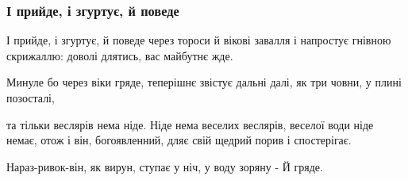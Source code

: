  
 
 

\subsubsection{І прийде, і згуртує, й поведе}

І прийде, і згуртує, 
й поведе через тороси й вікові завалля 
і напростує гнівною скрижаллю: 
доволі длятись, вас майбутнє жде. 

Минуле бо через віки гряде, 
теперішнє звістує дальні далі, 
як три човни, у плині позосталі, 

та тільки веслярів нема ніде. 
Ніде нема веселих веслярів, 
веселої води ніде немає, 
отож і він, богоявленний, 
дляє свій щедрий порив і спостерігає. 

Нараз-ривок-він, як вирун, 
ступає у ніч, у воду зоряну -
Й гряде.
